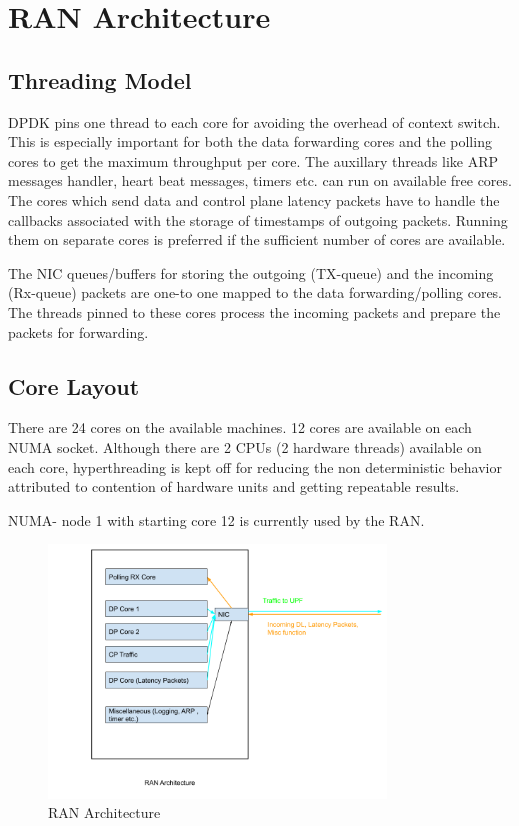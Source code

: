 \section{RAN Architecture}
\subsection{Threading Model}
DPDK pins one thread to each core for avoiding the overhead of context switch.
This is especially important for both the data forwarding cores and the polling
cores to get the maximum throughput per core. The auxillary threads like ARP
messages handler, heart beat messages, timers etc. can run on available free cores. The cores which send data and control plane latency packets have to handle the callbacks associated with the storage of timestamps of outgoing packets. Running them on separate cores is preferred if the sufficient number of cores are available.

The NIC queues/buffers for storing the outgoing (TX-queue) and the incoming
(Rx-queue) packets are one-to one mapped to the data forwarding/polling cores.
The threads pinned to these cores process the incoming packets and prepare the packets for forwarding.


\subsection{Core Layout}
There are 24 cores on the available machines. 12 cores are available on each NUMA socket.
Although there are 2 CPUs (2 hardware threads) available on each core, hyperthreading is
kept off for reducing the non deterministic behavior attributed to contention of hardware units
and getting repeatable results.

NUMA- node 1 with starting core 12 is currently used by the RAN.
\begin{figure}[htbp]
	\centering
	\includegraphics[width=0.8\textwidth, keepaspectratio]{./fig/RANArchitecture.png}
	\caption{RAN Architecture}
	\label{fig:RAN}
\end{figure}

